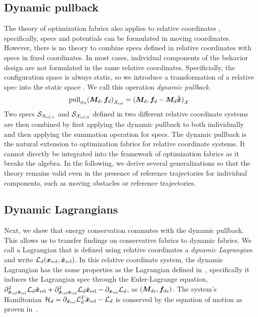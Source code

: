 \subsection{Dynamic pullback}%
\label{sub:dynamic_pullback}

The theory of optimization fabrics also applies to relative coordinates \xr{}, specifically,
specs and potentials can be formulated in moving coordinates. However, 
there is no theory to combine specs defined in relative coordinates with specs in fixed
coordinates.
In most cases, individual components of the
behavior design are not formulated in the same relative coordinates. Specificially, the
configuration space is always static, so we introduce a transformation of a relative spec
into the static space \X{}. We call this operation \textit{dynamic pullback}.
\begin{equation}
  \textrm{pull}_{\phi_d}{{(\bm{M}_d,\bm{f}_d)}_{\mathcal{X}_{\textrm{rel}}}} = {(\bm{M}_d, \bm{f}_d - \bm{M}_d\ddot{\bm{\tilde{x}}})}_{\mathcal{X}}
  \label{eq:dynamic_pull}
\end{equation}
Two specs $\mathcal{S}_{\mathcal{X}_{\textrm{rel,1}}}$ and $\mathcal{S}_{\mathcal{X}_{\textrm{rel,2}}}$ defined
in two different relative coordinate systems are then combined by
first applying the dynamic pullback to both individually and then applying the summation
operation for specs. The dynamic pullback is the natural extension to optimization fabrics
for relative coordinate systems. It cannot directly be
integrated into the framework of optimization
fabrics as it breaks the algebra. In the following, we derive several
generalizations so that the theory remains 
valid even in the presence of reference trajectories for individual components, such as moving
obstacles or reference trajectories.

\subsection{Dynamic Lagrangians}%
\label{sub:dynamic_lagrangians}

Next, we show that energy conservation commutes with the dynamic pullback. This allows us to
transfer findings on conservative fabrics to dynamic fabrics.
We call a Lagrangian that is defined using relative coordinates
a \textit{dynamic Lagrangian} and write $\mathcal{L}_d(\bm{x}_{\textrm{rel}}, \dot{\bm{x}}_{\textrm{rel}})$. 
In this relative coordinate system, the dynamic
Lagrangian has the same properties as the Lagrangian defined in~\cite{Ratliff2020},
specifically it induces the Lagrangian spec through the Euler-Lagrange equation, 
$\partial^2_{\dot{\bm{x}}_{\textrm{rel}}\dot{\bm{x}}_{\textrm{rel}}}\mathcal{L}_d\ddot{\bm{x}}_{\textrm{rel}} + \partial^2_{\dot{\bm{x}}_{\textrm{rel}}\bm{x}_{\textrm{rel}}}\mathcal{L}_d\dot{\bm{x}}_{\textrm{rel}} - \partial_{\bm{x}_{\textrm{rel}}}\mathcal{L}_d$, 
as $(\bm{M}_{de},\bm{f}_{de})$. The system's Hamiltonian $\mathcal{H}_d = \partial_{\dot{\bm{x}}_{\textrm{rel}}}\mathcal{L}_d^T\dot{\bm{x}}_{\textrm{rel}} - \mathcal{L}_d$ is
conserved by the equation of motion as proven in~\cite{Ratliff2020}.

